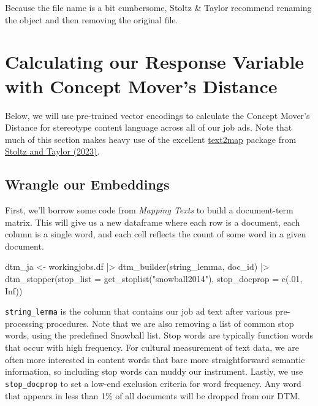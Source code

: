 \documentclass[
  letterpaper,
  DIV=11,
  numbers=noendperiod]{scrreprt}
\newenvironment{Shaded}{\begin{snugshade}}{\end{snugshade}}
\newcommand{\AttributeTok}[1]{\textcolor[rgb]{0.40,0.45,0.13}{#1}}
\newcommand{\ConstantTok}[1]{\textcolor[rgb]{0.56,0.35,0.01}{#1}}
\newcommand{\DecValTok}[1]{\textcolor[rgb]{0.68,0.00,0.00}{#1}}
\newcommand{\FunctionTok}[1]{\textcolor[rgb]{0.28,0.35,0.67}{#1}}
\newcommand{\NormalTok}[1]{\textcolor[rgb]{0.00,0.23,0.31}{#1}}
\newcommand{\OtherTok}[1]{\textcolor[rgb]{0.00,0.23,0.31}{#1}}
\newcommand{\SpecialCharTok}[1]{\textcolor[rgb]{0.37,0.37,0.37}{#1}}
\newcommand{\StringTok}[1]{\textcolor[rgb]{0.13,0.47,0.30}{#1}}
\begin{document}
Because the file name is a bit cumbersome, Stoltz \& Taylor recommend
renaming the object and then removing the original file.

\section{Calculating our Response Variable with Concept Mover's
Distance}\label{calculating-our-response-variable-with-concept-movers-distance}

Below, we will use pre-trained vector encodings to calculate the Concept
Mover's Distance for stereotype content language across all of our job
ads. Note that much of this section makes heavy use of the excellent
\href{https://culturalcartography.gitlab.io/text2map/}{text2map} package
from
\href{https://global.oup.com/academic/product/mapping-texts-9780197756881?cc=us&lang=en&}{Stoltz
and Taylor (2023)}.

\subsection{Wrangle our Embeddings}\label{wrangle-our-embeddings}

First, we'll borrow some code from \emph{Mapping Texts} to build a
document-term matrix. This will give us a new dataframe where each row
is a document, each column is a single word, and each cell reflects the
count of some word in a given document.

\begin{Shaded}
\begin{Highlighting}[]
\NormalTok{dtm\_ja }\OtherTok{\textless{}{-}}\NormalTok{ workingjobs.df }\SpecialCharTok{|\textgreater{}}
  \FunctionTok{dtm\_builder}\NormalTok{(string\_lemma, doc\_id) }\SpecialCharTok{|\textgreater{}}
  \FunctionTok{dtm\_stopper}\NormalTok{(}\AttributeTok{stop\_list =} \FunctionTok{get\_stoplist}\NormalTok{(}\StringTok{"snowball2014"}\NormalTok{),}
              \AttributeTok{stop\_docprop =} \FunctionTok{c}\NormalTok{(.}\DecValTok{01}\NormalTok{, }\ConstantTok{Inf}\NormalTok{))}
\end{Highlighting}
\end{Shaded}

\texttt{string\_lemma} is the column that contains our job ad text after
various pre-processing procedures. Note that we are also removing a list
of common stop words, using the predefined Snowball list. Stop words are
typically function words that occur with high frequency. For cultural
measurement of text data, we are often more interested in content words
that bare more straightforward semantic information, so including stop
words can muddy our instrument. Lastly, we use \texttt{stop\_docprop} to
set a low-end exclusion criteria for word frequency. Any word that
appears in less than 1\% of all documents will be dropped from our DTM.
\end{document}
